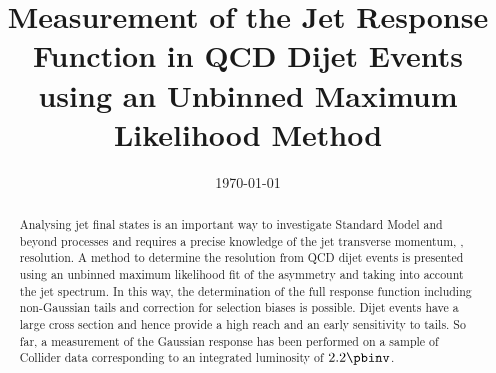 \documentclass[a4paper]{cmspaper} %
\begin{document}
\begin{titlepage}
  \date{\today}
  \title{Measurement of the Jet \pt Response Function in QCD Dijet
    Events using an Unbinned Maximum Likelihood Method}
  \begin{abstract}
    Analysing jet final states is an important way to investigate
    Standard Model and beyond processes and requires a precise
    knowledge of the jet transverse momentum, \pt, resolution.	
    A method to determine the resolution from QCD dijet
    events is presented using an unbinned maximum
    likelihood fit of the \pt asymmetry and taking into account the jet \pt spectrum.
    In this way, the determination of the full response function including non-Gaussian
    tails and correction for selection biases is possible.
    Dijet events have a large cross section and hence provide a
    high \pt reach and an early sensitivity to tails.
    So far, a measurement of the Gaussian response has been performed
    on a sample of Collider data corresponding to an integrated luminosity of $2.2\pbinv$.
  \end{abstract}
\end{titlepage}
\tableofcontents












\end{document}
